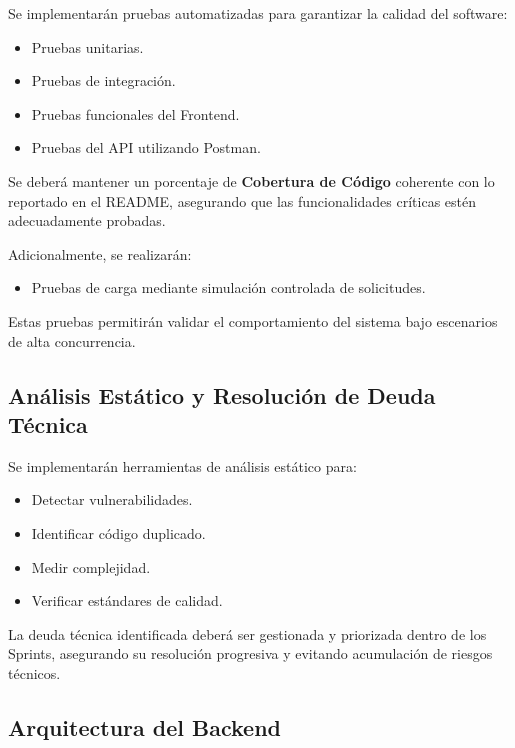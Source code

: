 \documentclass[12pt]{article}
\begin{document}
Se implementarán pruebas automatizadas para garantizar la calidad del software:

\begin{itemize}
    \item Pruebas unitarias.
    \item Pruebas de integración.
    \item Pruebas funcionales del Frontend.
    \item Pruebas del API utilizando Postman.
\end{itemize}

Se deberá mantener un porcentaje de \textbf{Cobertura de Código} coherente con lo reportado en el README, asegurando que las funcionalidades críticas estén adecuadamente probadas.

Adicionalmente, se realizarán:

\begin{itemize}
    \item Pruebas de carga mediante simulación controlada de solicitudes.
\end{itemize}

Estas pruebas permitirán validar el comportamiento del sistema bajo escenarios de alta concurrencia.

\subsection{Análisis Estático y Resolución de Deuda Técnica}

Se implementarán herramientas de análisis estático para:

\begin{itemize}
    \item Detectar vulnerabilidades.
    \item Identificar código duplicado.
    \item Medir complejidad.
    \item Verificar estándares de calidad.
\end{itemize}

La deuda técnica identificada deberá ser gestionada y priorizada dentro de los Sprints, asegurando su resolución progresiva y evitando acumulación de riesgos técnicos.

\subsection{Arquitectura del Backend}
\end{document}
